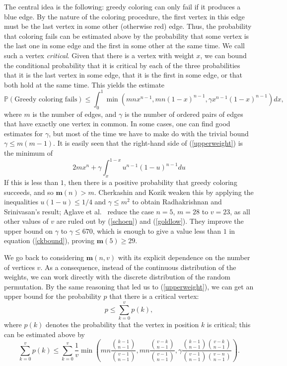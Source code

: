 \documentclass[a4paper,12pt]{article}
\begin{document}
The central idea is the following: greedy coloring can only fail if it
produces a blue edge. By the nature of the coloring procedure, 
the first vertex in this edge must be the
last vertex in some other (otherwise red) edge. 
Thus, the probability that coloring fails can be estimated above by the
probability that some vertex is the last one in some edge and the first in some
other at the same time. We call such a vertex {\em critical}. Given that there
is a vertex with weight $x$, we can bound the conditional probability that
it is critical by each of the three probabilities that it is the last vertex
in some edge, that it is the first in some edge, or that both hold at the
same time. This yields the estimate
\begin{equation}\label{upperweight}\mathbb P(\mbox{Greedy coloring fails})\le 
\int_0^1\min(mnx^{n-1},mn(1-x)^{n-1},\gamma x^{n-1}(1-x)^{n-1})dx,
\end{equation}
where $m$ is the number of edges, and $\gamma$ is the number of 
ordered pairs of edges that have exactly one vertex in common. 
In some cases, one can find good estimates for $\gamma$, but most of
the time we have to make do with 
the trivial bound $\gamma\le m(m-1)$. 
It is easily seen that the right-hand side of (\ref{upperweight}) is
the minimum of
\begin{equation}\label{ckbound}
2mx^n+\gamma\int_x^{1-x}u^{n-1}(1-u)^{n-1}du\end{equation}
If this is less than $1$, then there is a positive probability that
greedy coloring succeeds, and so $\mathbf m(n)>m$.
Cherkashin and Kozik \cite{cherk} weaken this by applying the inequalities
$u(1-u)\le1/4$ and $\gamma\le m^2$ to obtain Radhakrishnan and Srinivasan's
\cite{srini} result; Aglave et al.\ \cite{shanni} reduce the case $n=5$,
$m=28$  to
$v=23$, as all other values of $v$ are ruled out by (\ref{schoen}) and
(\ref{goldlow}). 
They improve the upper
bound on $\gamma$ to $\gamma\le 670$, which is enough to give a value less
than $1$
in equation (\ref{ckbound}), proving $\mathbf m(5)\ge 29$. 

We go back to considering $\mathbf m(n,v)$ with its explicit dependence on the
number of vertices $v$. 
As a consequence, instead of the continuous distribution of the weights, 
we can work directly with the discrete distribution of the random permutation. 
By the same reasoning that led us to (\ref{upperweight}), we can get an 
upper bound for
the probability $p$ that there is a critical vertex:
\[p\le \sum_{k=0}^v p(k),\]
where $p(k)$ denotes the probability that the vertex in position $k$ is
critical; this can be estimated above by
\begin{equation}\label{upperperm}
\sum_{k=0}^v
p(k)\le\sum_{k=0}^v
 \frac{1}{v}\min\left(mn\frac{
\genfrac(){0pt}1{k-1}{n-1}
}{
\genfrac(){0pt}1{v-1}{n-1}
},
mn\frac{
\genfrac(){0pt}1{v-k}{n-1}
}{
\genfrac(){0pt}1{v-1}{n-1}
},
\gamma\frac{
\genfrac(){0pt}1{k-1}{n-1}
\genfrac(){0pt}1{v-k}{n-1}
}{
\genfrac(){0pt}1{v-1}{n-1}
\genfrac(){0pt}1{v-n}{n-1}
}\right).\end{equation}
\end{document}
